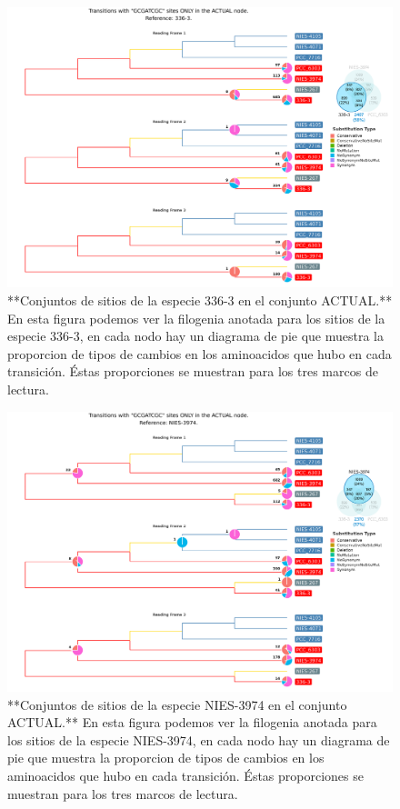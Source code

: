 \documentclass[
]{book}
\begin{document}
\begin{figure}

{\centering \includegraphics[width=1.2\linewidth]{Clados/Calothrix_B/figures/A/GCGATCGC/Actual/336-3_Actual_A_tree} 

}

\caption{**Conjuntos de sitios de la especie 336-3 en el conjunto ACTUAL.** En esta figura podemos ver la filogenia anotada para los sitios de la especie 336-3, en cada nodo hay un diagrama de pie que muestra la proporcion de tipos de cambios en los aminoacidos que hubo en cada transición. Éstas proporciones se muestran para los tres marcos de lectura.}\label{fig:FIG9}
\end{figure}

\begin{figure}

{\centering \includegraphics[width=1.2\linewidth]{Clados/Calothrix_B/figures/A/GCGATCGC/Actual/NIES-3974_Actual_A_tree} 

}

\caption{**Conjuntos de sitios de la especie NIES-3974 en el conjunto ACTUAL.** En esta figura podemos ver la filogenia anotada para los sitios de la especie NIES-3974, en cada nodo hay un diagrama de pie que muestra la proporcion de tipos de cambios en los aminoacidos que hubo en cada transición. Éstas proporciones se muestran para los tres marcos de lectura.}\label{fig:FIG10}
\end{figure}
\end{document}
